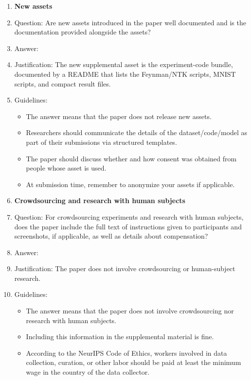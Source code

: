 \documentclass{article}
\begin{document}
\begin{enumerate}[leftmargin=1.5em]
\item {\bf New assets}
    \item[] Question: Are new assets introduced in the paper well documented and is the documentation provided alongside the assets?
    \item[] Answer: \answerYes{}
    \item[] Justification: The new supplemental asset is the experiment-code bundle, documented by a README that lists the Feynman/NTK scripts, MNIST scripts, and compact result files.
    \item[] Guidelines:
    \begin{itemize}
        \item The answer \answerNA{} means that the paper does not release new assets.
        \item Researchers should communicate the details of the dataset\slash code\slash model as part of their submissions via structured templates.
        \item The paper should discuss whether and how consent was obtained from people whose asset is used.
        \item At submission time, remember to anonymize your assets if applicable.
    \end{itemize}

\item {\bf Crowdsourcing and research with human subjects}
    \item[] Question: For crowdsourcing experiments and research with human subjects, does the paper include the full text of instructions given to participants and screenshots, if applicable, as well as details about compensation?
    \item[] Answer: \answerNA{}
    \item[] Justification: The paper does not involve crowdsourcing or human-subject research.
    \item[] Guidelines:
    \begin{itemize}
        \item The answer \answerNA{} means that the paper does not involve crowdsourcing nor research with human subjects.
        \item Including this information in the supplemental material is fine.
        \item According to the NeurIPS Code of Ethics, workers involved in data collection, curation, or other labor should be paid at least the minimum wage in the country of the data collector.
    \end{itemize}


\end{enumerate}
\end{document}
